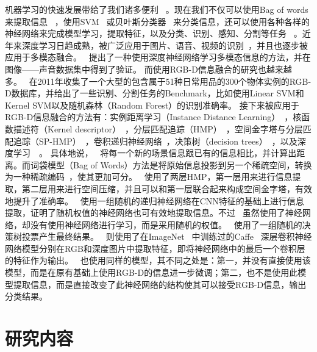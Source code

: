 机器学习的快速发展带给了我们诸多便利~ 。现在我们不仅可以使用Bag of words来提取信息~ ，使用SVM~ 或贝叶斯分类器~ 来分类信息，还可以使用各种各样的神经网络来完成模型学习，提取特征，以及分类、识别、感知、分割等任务~ 。近年来深度学习日趋成熟，被广泛应用于图片、语音、视频的识别~，并且也逐步被应用于多模态融合。~ 提出了一种使用深度神经网络学习多模态信息的方法，并在图像——声音数据集中得到了验证。
而使用RGB-D信息融合的研究也越来越多。~ 在2011年收集了一个大型的包含属于51种日常用品的300个物体实例的RGB-D数据库，并给出了一些识别、分割任务的Benchmark，比如使用Linear SVM和Kernel SVM以及随机森林（Random Forest）的识别准确率。
接下来被应用于RGB-D信息融合的方法有：实例距离学习（Instance Distance Learning）~，核函数描述符（Kernel descriptor）~，分层匹配追踪（HMP）~，空间金字塔与分层匹配追踪（SP-HMP）~，卷积递归神经网络~，决策树（decision trees）~，以及深度学习~~。
具体地说，~ 将每一个新的场景信息跟已有的信息相比，并计算出距离。而词袋模型（Bag of Words）方法是将原始信息投影到另一个稀疏空间，转换为一种稀疏编码~，使其更加可分。~ 使用了两层HMP，第一层用来进行信息提取，第二层用来进行空间压缩，并且可以和第一层联合起来构成空间金字塔，有效地提升了准确率。~ 使用一组随机的递归神经网络在CNN特征的基础上进行信息提取，证明了随机权值的神经网络也可有效地提取信息。不过~ 虽然使用了神经网络，却没有使用神经网络进行学习，而是采用随机的权值。~ 使用了一组随机的决策树投票产生最终结果。~ 则使用了在ImageNet~ 中训练过的Caffe~ 深层卷积神经网络模型分别在RGB和深度图片中提取特征，即将神经网络中的最后一个卷积层的特征作为输出。~ 也使用同样的模型，其不同之处是：第一，并没有直接使用该模型，而是在原有基础上使用RGB-D的信息进一步微调；第二，也不是使用此模型提取信息，而是直接改变了此神经网络的结构使其可以接受RGB-D信息，输出分类结果。


\section{研究内容}
\label{sec:content}


